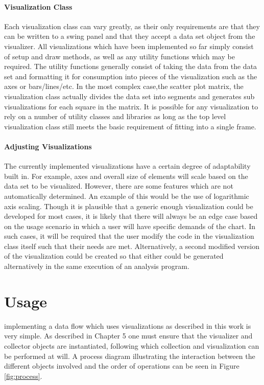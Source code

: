 \paragraph{Visualization Class}
Each visualization class can vary greatly, as their only requirements are that they can be written to a swing panel and that they accept a data set object from the visualizer. All visualizations which have been implemented so far simply consist of setup and draw methods, as well as any utility functions which may be required. The utility functions generally consist of taking the data from the data set and formatting it for consumption into pieces of the visualization such as the axes or bars/lines/etc. In the most complex case,the scatter plot matrix, the visualization class actually divides the data set into segments and generates sub visualizations for each square in the matrix. It is possible for any visualization to rely on a number of utility classes and libraries as long as the top level visualization class still meets the basic requirement of fitting into a single frame. 

\paragraph{Adjusting Visualizations}
The currently implemented visualizations have a certain degree of adaptability built in. For example, axes and overall size of elements will scale based on the data set to be visualized. However, there are some features which are not automatically determined. An example of this would be the use of logarithmic axis scaling. Though it is plausible that a generic enough visualization could be developed for most cases, it is likely that there will always be an edge case based on the usage scenario in which a user will have specific demands of the chart. In such cases, it will be required that the user modify the code in the visualization class itself such that their needs are met. Alternatively, a second modified version of the visualization could be created so that either could be generated alternatively in the same execution of an analysis program. 

\section{Usage}
\label{usage}
 implementing a data flow which uses visualizations as described in this work is very simple. As described in Chapter 5 one must ensure that the visualizer and collector objects are instantiated, following which collection and visualization can be performed at will. A process diagram illustrating the interaction between the different objects involved and the order of operations can be seen in Figure \ref{fig:process}.

